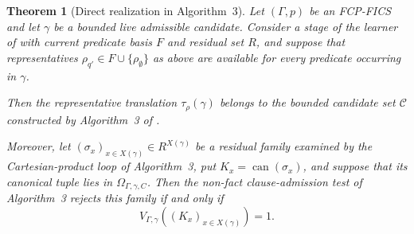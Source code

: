 \documentclass[11pt]{article}
\newtheorem{theorem}{Theorem}[section]
\theoremstyle{definition}
\theoremstyle{remark}
\begin{document}
\begin{theorem}[Direct realization in Algorithm~3]
\label{thm:alg3-realization}
Let \((\Gamma,p)\) be an FCP-FICS and let \(\gamma\) be a bounded live
admissible candidate.  Consider a stage of the learner of
\cite{ShoudaiEtAl2026} with current predicate basis \(F\) and residual set
\(R\), and suppose that representatives
\(\rho_{q'}\in F\cup\{\rho_\emptyset\}\) as above are available for every
predicate occurring in \(\gamma\).

Then the representative translation \(\tau_\rho(\gamma)\) belongs to the
bounded candidate set \(\mathcal C\) constructed by Algorithm~3 of
\cite{ShoudaiEtAl2026}.

Moreover, let
\((\sigma_x)_{x\in X(\gamma)}\in R^{X(\gamma)}\)
be a residual family examined by the Cartesian-product loop of Algorithm~3,
put \(K_x=\operatorname{can}(\sigma_x)\), and suppose that its canonical
tuple lies in \(\Omega_{\Gamma,\gamma,C}\).  Then the non-fact
clause-admission test of Algorithm~3 rejects this family if and only if
\[
V_{\Gamma,\gamma}((K_x)_{x\in X(\gamma)})=1.
\]
\end{theorem}
\end{document}
